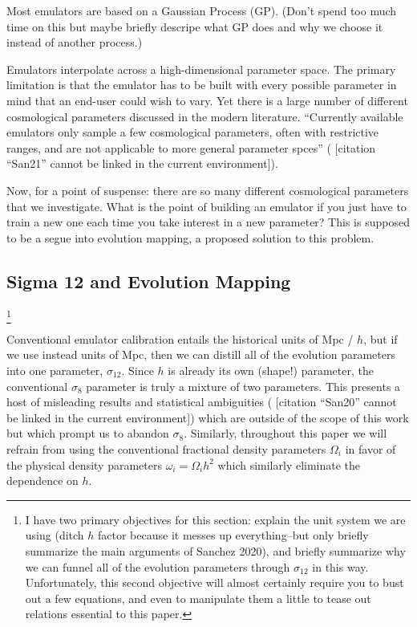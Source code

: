 \documentclass[11pt]{article}
\newcommand{\cbib}[1]
{\IfFileExists{biblatex.sty}
{\cite{#1}}
{[citation ``#1'' cannot be linked in the current environment]}}
\begin{document}
Most emulators are based on a Gaussian Process (GP). (Don't spend too much time
on this but maybe briefly descripe what GP does and why we choose it instead
of another process.)

Emulators interpolate across a high-dimensional parameter space. The primary
limitation is that the emulator has to be built with every possible parameter
in mind that an end-user could wish to vary. Yet there is a large number of
different cosmological parameters discussed in the modern literature.
``Currently available emulators only sample a few cosmological parameters,
often with restrictive ranges, and are not applicable to more general parameter
spces'' (\cbib{San21}).

Now, for a point of suspense: there are so many different cosmological
parameters that we investigate. What is the point of building an emulator if
you just have to train a new one each time you take interest in a new
parameter? This is supposed to be a segue into evolution mapping, a proposed
solution to this problem.

\begin{centering}
\section{Sigma 12 and Evolution Mapping}
\label{sec: sigma_and_evMapping}
\end{centering}

\footnote{
    I have two primary objectives for this section: explain the unit system
    we are using (ditch $h$ factor because it messes up everything--but
    only briefly summarize the main arguments of Sanchez 2020), and briefly
    summarize why we can funnel all of the evolution parameters through
    $\sigma_{12}$ in this way. Unfortunately, this second objective will
    almost certainly require you to bust out a few equations, and even to
    manipulate them a little to tease out relations essential to this paper.
}

Conventional emulator calibration entails the historical units of Mpc / $h$,
but if we use instead units of Mpc, then we can distill all of the evolution
parameters into one parameter, $\sigma_{12}$. Since $h$ is already its own
(shape!) parameter, the conventional $\sigma_8$ parameter is truly a mixture
of two parameters. This presents a host of misleading results  and statistical
ambiguities (\cbib{San20}) which are outside of the scope of this work but
which prompt us to abandon $\sigma_8$.
Similarly, throughout this paper we will refrain from using the conventional
fractional density parameters $\Omega_i$ in favor of the physical density
parameters $\omega_i = \Omega_i h^2$ which similarly eliminate the
dependence on $h$.
\end{document}
